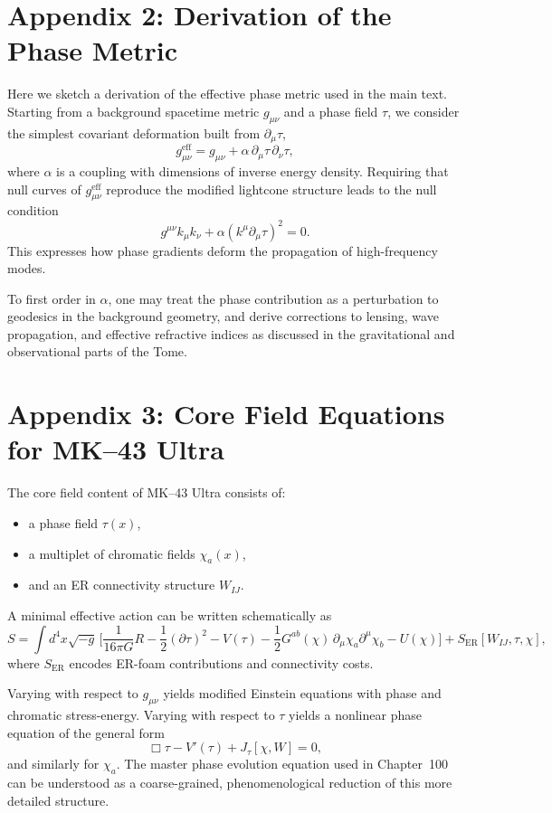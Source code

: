 \chapter{Appendix 2: Derivation of the Phase Metric}

Here we sketch a derivation of the effective phase metric used in the main text.
Starting from a background spacetime metric \(g_{\mu\nu}\) and a phase field \(\tau\), we consider the simplest covariant deformation built from \(\partial_\mu \tau\),
\[
g^{\mathrm{eff}}_{\mu\nu}
  = g_{\mu\nu}
  + \alpha\,\partial_\mu \tau\,\partial_\nu \tau,
\]
where \(\alpha\) is a coupling with dimensions of inverse energy density.
Requiring that null curves of \(g^{\mathrm{eff}}_{\mu\nu}\) reproduce the modified lightcone structure leads to the null condition
\[
g^{\mu\nu}k_\mu k_\nu + \alpha (k^\mu \partial_\mu \tau)^2 = 0.
\]
This expresses how phase gradients deform the propagation of high-frequency modes.

To first order in \(\alpha\), one may treat the phase contribution as a perturbation to geodesics in the background geometry, and derive corrections to lensing, wave propagation, and effective refractive indices as discussed in the gravitational and observational parts of the Tome.

\chapter{Appendix 3: Core Field Equations for MK--43 Ultra}

The core field content of MK--43 Ultra consists of:
\begin{itemize}
  \item a phase field \(\tau(x)\),
  \item a multiplet of chromatic fields \(\chi_a(x)\),
  \item and an ER connectivity structure \(W_{IJ}\).
\end{itemize}
A minimal effective action can be written schematically as
\[
S = \int d^4x \sqrt{-g}\,\Big[
  \frac{1}{16\pi G}R
  - \frac{1}{2}(\partial\tau)^2
  - V(\tau)
  - \frac{1}{2}G^{ab}(\chi)\,\partial_\mu \chi_a \partial^\mu \chi_b
  - U(\chi)
\Big] + S_{\mathrm{ER}}[W_{IJ},\tau,\chi],
\]
where \(S_{\mathrm{ER}}\) encodes ER-foam contributions and connectivity costs.

Varying with respect to \(g_{\mu\nu}\) yields modified Einstein equations with phase and chromatic stress-energy.
Varying with respect to \(\tau\) yields a nonlinear phase equation of the general form
\[
\Box \tau - V'(\tau) + J_\tau[\chi,W] = 0,
\]
and similarly for \(\chi_a\).
The master phase evolution equation used in Chapter~100 can be understood as a coarse-grained, phenomenological reduction of this more detailed structure.

